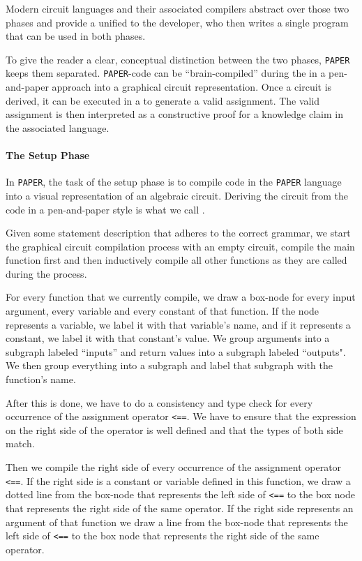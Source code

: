 Modern circuit languages and their associated compilers abstract over those two phases and provide a unified  to the developer, who then writes a single program that can be used in both phases.

To give the reader a clear, conceptual distinction between the two phases, \texttt{PAPER} keeps them separated. \texttt{PAPER}-code can be ``brain-compiled'' during the  in a pen-and-paper approach into a graphical circuit representation. Once a circuit is derived, it can be executed in a  to generate a valid assignment. The valid assignment is then interpreted as a constructive proof for a knowledge claim in the associated language.
\paragraph{The Setup Phase} In \texttt{PAPER}, the task of the setup phase is to compile code in the \texttt{PAPER} language into a visual representation of an algebraic circuit. Deriving the circuit from the code in a pen-and-paper style is what we call .

Given some statement description that adheres to the correct grammar, we start the graphical circuit compilation process with an empty circuit, compile the main function first and then inductively compile all other functions as they are called during the process. 

For every function that we currently compile, we draw a box-node for every input argument, every variable and every constant of that function. If the node represents a variable, we label it with that variable's name, and if it represents a constant, we label it with that constant's value. We group arguments into a subgraph labeled ``inputs'' and return values into a subgraph labeled ``outputs". We then group everything into a subgraph and label that subgraph with the function's name.

After this is done, we have to do a consistency and type check for every occurrence of the assignment operator \texttt{<==}. We have to ensure that the expression on the right side of the operator is well defined and that the types of both side match.

Then we compile the right side of every occurrence of the assignment operator \texttt{<==}. If the right side is a constant or variable defined in this function, we draw a dotted line from the box-node that represents the left side of \texttt{<==} to the box node that represents the right side of the same operator. If the right side represents an argument of that function we draw a line from the box-node that represents the left side of \texttt{<==} to the box node that represents the right side of the same operator. 

